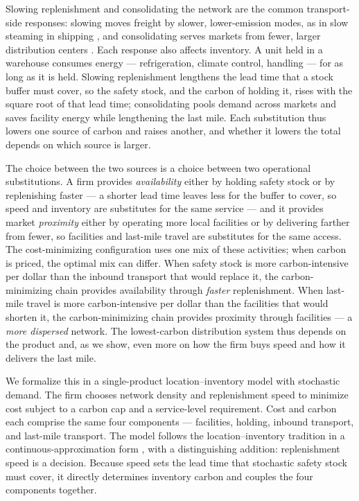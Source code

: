 \documentclass[11pt]{article}
\theoremstyle{definition}
\theoremstyle{remark}
\theoremstyle{plain}
\begin{document}
Slowing replenishment and consolidating the network are the common transport-side responses: slowing moves
freight by slower, lower-emission modes, as in slow steaming in shipping
\citep{psaraftis2013speed, cariou2011slow}, and consolidating serves markets from fewer, larger distribution
centers \citep{mckinnon2012setting}. Each response also affects inventory. A unit held in a warehouse consumes
energy --- refrigeration, climate control, handling --- for as long as it is held. Slowing replenishment
lengthens the lead time that a stock buffer must cover, so the safety stock, and the carbon of holding it,
rises with the square root of that lead time; consolidating pools demand across markets
\citep{eppen1979effects} and saves facility energy while lengthening the last mile. Each substitution thus lowers one
source of carbon and raises another, and whether it lowers the total depends on which source is larger.

The choice between the two sources is a choice between two operational substitutions. A firm
provides \emph{availability} either by holding safety stock or by replenishing faster --- a shorter lead
time leaves less for the buffer to cover, so speed and inventory are substitutes for the same service ---
and it provides market \emph{proximity} either by operating more local facilities or by delivering farther
from fewer, so facilities and last-mile travel are substitutes for the same access. The cost-minimizing configuration uses one mix of
these activities; when carbon is priced, the optimal mix can differ. When safety stock is more
carbon-intensive per dollar than the inbound transport that would replace it, the carbon-minimizing chain
provides availability through \emph{faster} replenishment. When last-mile travel is more carbon-intensive
per dollar than the facilities that would shorten it, the carbon-minimizing chain provides proximity through
facilities --- a \emph{more dispersed} network. The lowest-carbon distribution system thus depends on the
product and, as we show, even more on how the firm buys speed and how it delivers the last mile.

We formalize this in a single-product location--inventory model with stochastic demand. The firm chooses
network density and replenishment speed to minimize cost subject to a carbon cap and a service-level
requirement. Cost and carbon each comprise the same four components --- facilities, holding, inbound
transport, and last-mile transport. The model follows the location--inventory tradition
\citep{daskin2002inventory, shen2003joint} in a continuous-approximation form
\citep{daganzo2005logistics}, with a distinguishing addition: replenishment speed is a decision. Because
speed sets the lead time that stochastic safety stock must cover, it directly determines inventory
carbon and couples the four components together.
\end{document}
